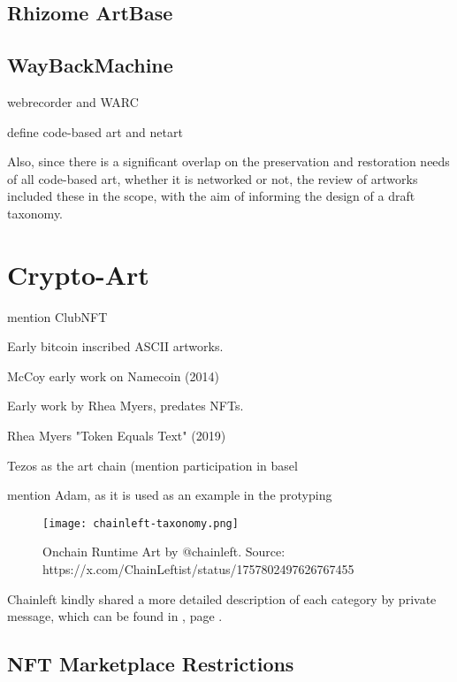 \subsection{Rhizome ArtBase}


\subsection{WayBackMachine}

webrecorder and WARC





\todo define code-based art and netart

Also, since there is a significant overlap on the preservation and restoration needs of all code-based art, whether it is networked or not, the review of artworks included these in the scope, with the aim of informing the design of a draft taxonomy.




\section{Crypto-Art}

\todo mention ClubNFT


Early bitcoin inscribed ASCII artworks.

McCoy early work on Namecoin (2014)

Early work by Rhea Myers, predates NFTs.

Rhea Myers "Token Equals Text" (2019)


Tezos as the art chain (mention participation in basel


\todo mention Adam, as it is used as an example in the protyping


\todo

\begin{figure}[h]
    \centering
    \texttt{[image: chainleft-taxonomy.png]}
    \caption[Onchain Runtime Art]{Onchain Runtime Art by @chainleft. Source: https://x.com/ChainLeftist/status/1757802497626767455}
    \label{fig:onchainruntimeart}
\end{figure}


Chainleft kindly shared a more detailed description of each category by private message, which can be found in , page \pageref{appx:chainleft-taxonomy}.


\subsection{NFT Marketplace Restrictions}

